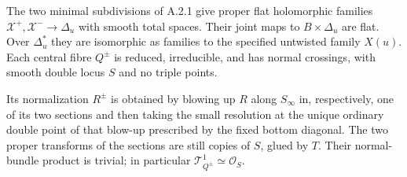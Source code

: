 \begin{theorem}\label{push:src:A.2.2}\label{push:A22}
The two minimal subdivisions of A.2.1 give proper flat holomorphic
families $\mathcal X^+,\mathcal X^-\to\Delta_u$ with smooth total
spaces. Their joint maps to $B\times\Delta_u$ are flat. Over
$\Delta_u^*$ they are isomorphic as families to the specified
untwisted family $X(u)$. Each central fibre $Q^\pm$ is reduced,
irreducible, and has normal crossings, with smooth double locus
$S$ and no triple points.

Its normalization $R^\pm$ is obtained by blowing up $R$ along
$S_\infty$ in, respectively, one of its two sections and then
taking the small resolution at the unique ordinary double point
of that blow-up prescribed by the fixed bottom diagonal.
The two proper transforms of the sections are still copies of
$S$, glued by $T$. Their normal-bundle product is trivial;
in particular $\mathcal T^1_{Q^\pm}\simeq\mathcal O_S$.
\end{theorem}
